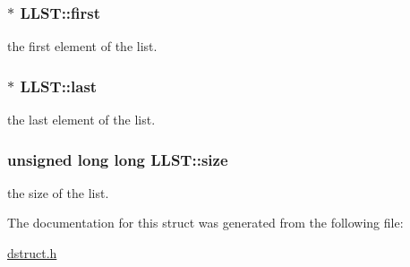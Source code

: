 \subsubsection[{\texorpdfstring{first}{first}}]{$\ast$ L\+L\+S\+T\+::first}\hypertarget{structLLST_a64cb4ed06a05e5d9609ee66037c2d678}{}\label{structLLST_a64cb4ed06a05e5d9609ee66037c2d678}
the first element of the list. 
\subsubsection[{\texorpdfstring{last}{last}}]{$\ast$ L\+L\+S\+T\+::last}\hypertarget{structLLST_a036571f75af8df62f99a7db4b94d6422}{}\label{structLLST_a036571f75af8df62f99a7db4b94d6422}
the last element of the list. 
\subsubsection[{\texorpdfstring{size}{size}}]{\setlength{\rightskip}{0pt plus 5cm}unsigned long long L\+L\+S\+T\+::size}\hypertarget{structLLST_a3ee1e8d7f235f4e95951006e7f52bf73}{}\label{structLLST_a3ee1e8d7f235f4e95951006e7f52bf73}
the size of the list. 

The documentation for this struct was generated from the following file\+:\begin{DoxyCompactItemize}
\item 
\hyperlink{dstruct_8h}{dstruct.\+h}\end{DoxyCompactItemize}
